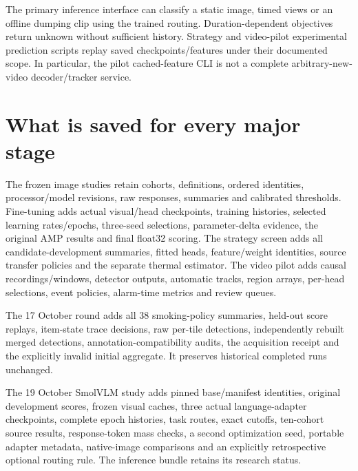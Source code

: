 The primary inference interface can classify a static image, timed views or an offline dumping clip using the trained routing. Duration-dependent objectives return unknown without sufficient history. Strategy and video-pilot experimental prediction scripts replay saved checkpoints/features under their documented scope. In particular, the pilot cached-feature CLI is not a complete arbitrary-new-video decoder/tracker service.

\section{What is saved for every major stage}
The frozen image studies retain cohorts, definitions, ordered identities, processor/model revisions, raw responses, summaries and calibrated thresholds. Fine-tuning adds actual visual/head checkpoints, training histories, selected learning rates/epochs, three-seed selections, parameter-delta evidence, the original AMP results and final float32 scoring. The strategy screen adds all candidate-development summaries, fitted heads, feature/weight identities, source transfer policies and the separate thermal estimator. The video pilot adds causal recordings/windows, detector outputs, automatic tracks, region arrays, per-head selections, event policies, alarm-time metrics and review queues.

The 17 October round adds all 38 smoking-policy summaries, held-out score replays, item-state trace decisions, raw per-tile detections, independently rebuilt merged detections, annotation-compatibility audits, the acquisition receipt and the explicitly invalid initial aggregate. It preserves historical completed runs unchanged.

The 19 October SmolVLM study adds pinned base/manifest identities, original development scores, frozen visual caches, three actual language-adapter checkpoints, complete epoch histories, task routes, exact cutoffs, ten-cohort source results, response-token mass checks, a second optimization seed, portable adapter metadata, native-image comparisons and an explicitly retrospective optional routing rule. The inference bundle retains its research status.

